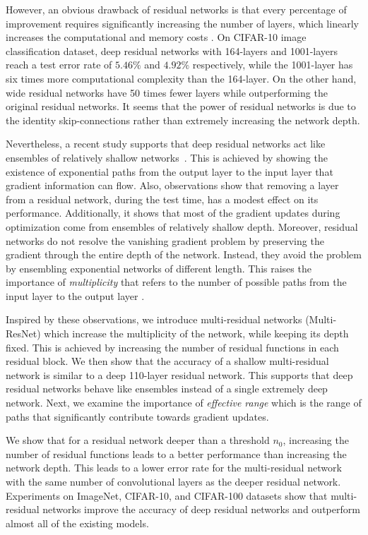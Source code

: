 \documentclass[journal]{IEEEtran}
\begin{document}
However, an obvious drawback of residual networks is that every percentage of improvement requires significantly increasing the number of layers, which linearly increases the computational and memory costs \cite{he2015deep}. On CIFAR-10 image classification dataset, deep residual networks with 164-layers and 1001-layers reach a test error rate of $5.46\%$ and $4.92\%$ respectively, while the 1001-layer has six times more computational complexity than the 164-layer. On the other hand, wide residual networks \cite{zagoruyko2016wide} have 50 times fewer layers while outperforming the original residual networks. It seems that the power of residual networks is due to the identity skip-connections rather than extremely increasing the network depth.




Nevertheless, a recent study  supports that deep residual networks  act like ensembles of relatively shallow networks~\cite{veit2016residual}. This is achieved by showing the existence of exponential paths from the output layer to the input layer that gradient information can flow. Also, observations show that removing a layer from a residual network, during the test time, has a modest effect on its performance. Additionally, it shows that most of the gradient updates during optimization come from ensembles of relatively shallow depth. Moreover, residual networks do not resolve the vanishing gradient problem by preserving the gradient through the entire depth of the network. Instead, they avoid the problem by ensembling  exponential networks of different length. This raises the importance of \textit{multiplicity} that refers to the number of possible paths from the input layer to the output layer \cite{veit2016residual}.


Inspired by these observations, we introduce multi-residual networks (Multi-ResNet) which increase the multiplicity of the network, while keeping its depth fixed. This is achieved by increasing the  number of residual functions in each residual block. We then show that the accuracy of a shallow multi-residual network is similar to a deep 110-layer residual network. This supports that deep residual networks behave like ensembles instead of a single extremely deep network. Next, we examine the importance of \textit{effective range} which is the range of paths that significantly contribute towards gradient updates. 

We show that for a residual network deeper than a threshold $n_0$, increasing the number of residual functions leads to a better performance than increasing the network depth. This leads to a lower error rate for the multi-residual network with the same number of convolutional layers as the deeper residual network. Experiments on ImageNet, CIFAR-10, and CIFAR-100 datasets show that multi-residual networks improve the accuracy of deep residual networks and outperform almost all of the existing models. 
\end{document}
